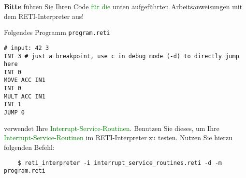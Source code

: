\documentclass{article}
\begin{document}
%



{\LARGE\bfseries\color{red}Bitte} führen Sie Ihren Code \textcolor{green}{für die} unten aufgeführten Arbeitsanweisungen mit dem RETI-Interpreter aus!

Folgendes Programm \texttt{program.reti}
\begin{verbatim}
# input: 42 3
INT 3 # just a breakpoint, use c in debug mode (-d) to directly jump here
INT 0
MOVE ACC IN1
INT 0
MULT ACC IN1
INT 1
JUMP 0
\end{verbatim} 
verwendet Ihre \textcolor{green}{Interrupt-Service-Routinen}. Benutzen Sie dieses, um Ihre \textcolor{green}{Interrupt-Service-Routinen} im RETI-Interpreter zu testen.
Nutzen Sie hierzu folgenden Befehl:
\begin{verbatim}
	$ reti_interpreter -i interrupt_service_routines.reti -d -m program.reti
\end{verbatim}

\end{document}
